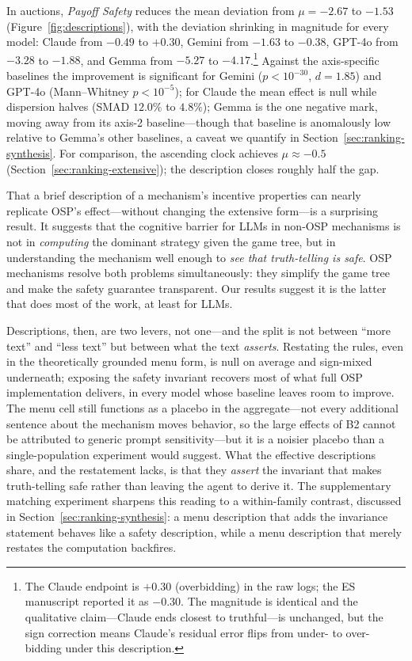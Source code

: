In auctions, \emph{Payoff Safety} reduces the mean deviation from
$\mu = -2.67$ to $-1.53$ (Figure~\ref{fig:descriptions}), with the deviation
shrinking in magnitude for every model: Claude from $-0.49$ to $+0.30$,
Gemini from $-1.63$ to $-0.38$, GPT-4o from $-3.28$ to $-1.88$, and Gemma
from $-5.27$ to $-4.17$.\footnote{The Claude endpoint is $+0.30$
(overbidding) in the raw logs; the ES manuscript reported it as $-0.30$. The
magnitude is identical and the qualitative claim---Claude ends closest to
truthful---is unchanged, but the sign correction means Claude's residual
error flips from under- to over-bidding under this description.} Against the
axis-specific baselines the improvement is significant for Gemini
($p < 10^{-30}$, $d = 1.85$) and GPT-4o (Mann--Whitney $p < 10^{-5}$); for
Claude the mean effect is null while dispersion halves (SMAD $12.0\%$ to
$4.8\%$); Gemma is the one negative mark, moving away from its axis-2
baseline---though that baseline is anomalously low relative to Gemma's other
baselines, a caveat we quantify in Section~\ref{sec:ranking-synthesis}. For
comparison, the ascending clock achieves $\mu \approx -0.5$
(Section~\ref{sec:ranking-extensive}); the description closes roughly half
the gap.

That a brief description of a mechanism's incentive properties can nearly
replicate OSP's effect---without changing the extensive form---is a
surprising result. It suggests that the cognitive barrier for LLMs in non-OSP
mechanisms is not in \emph{computing} the dominant strategy given the game
tree, but in understanding the mechanism well enough to \emph{see that
truth-telling is safe}. OSP mechanisms resolve both problems simultaneously:
they simplify the game tree and make the safety guarantee transparent. Our
results suggest it is the latter that does most of the work, at least for
LLMs.

Descriptions, then, are two levers, not one---and the split is not between
``more text'' and ``less text'' but between what the text \emph{asserts}.
Restating the rules, even in the theoretically grounded menu form, is null on
average and sign-mixed underneath; exposing the safety invariant recovers
most of what full OSP implementation delivers, in every model whose baseline
leaves room to improve. The menu cell still functions as a placebo in the
aggregate---not every additional sentence about the mechanism moves behavior,
so the large effects of B2 cannot be attributed to generic prompt
sensitivity---but it is a noisier placebo than a single-population experiment
would suggest. What the effective descriptions share, and the restatement
lacks, is that they \emph{assert} the invariant that makes truth-telling safe
rather than leaving the agent to derive it. The supplementary matching
experiment sharpens this reading to a within-family contrast, discussed in
Section~\ref{sec:ranking-synthesis}: a menu description that adds the
invariance statement behaves like a safety description, while a menu
description that merely restates the computation backfires.


